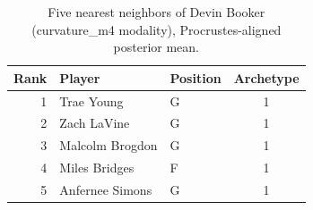 \begin{table}[htbp]
  \centering\small
  \begin{tabular}{rllc}
    \toprule
    Rank & Player & Position & Archetype \\
    \midrule
    1 & Trae Young & G & 1 \\
    2 & Zach LaVine & G & 1 \\
    3 & Malcolm Brogdon & G & 1 \\
    4 & Miles Bridges & F & 1 \\
    5 & Anfernee Simons & G & 1 \\
    \bottomrule
  \end{tabular}
  \caption{Five nearest neighbors of Devin Booker (curvature_m4 modality), Procrustes-aligned posterior mean.}
  \label{tab:Devin_Booker_neighbors_curvature_m4}
\end{table}

